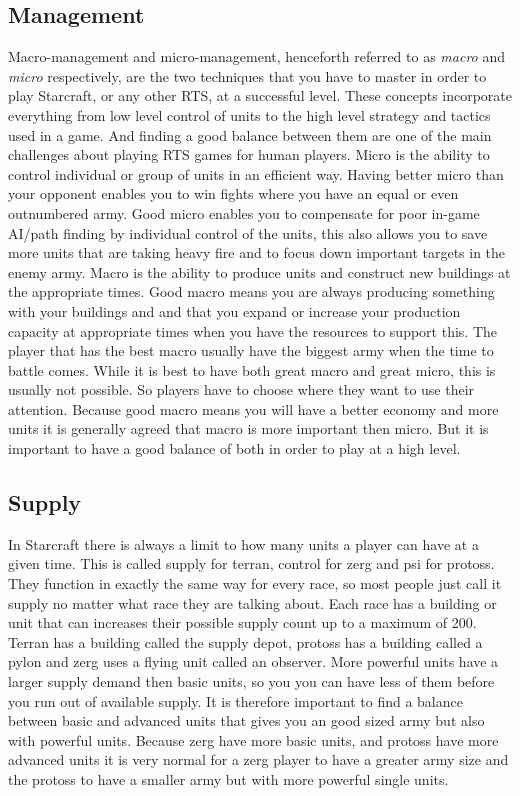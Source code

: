 \subsection{Management}
Macro-management and micro-management, henceforth referred to as \textit{macro}
and \textit{micro} respectively, are the two techniques that you have to master
in order to play Starcraft, or any other RTS, at a successful level. These
concepts incorporate everything from low level control of units to the high
level strategy and tactics used in a game. And finding a good balance between
them are one of the main challenges about playing RTS games for human players.
Micro is the ability to control individual or group of units in an efficient
way. Having better micro than your opponent enables you to win fights where you
have an equal or even outnumbered army. Good micro enables you to 
compensate for poor in-game AI/path finding by individual control of the
units, this also allows you to save more units that are taking heavy fire and to
focus down important targets in the enemy army. Macro is the ability to produce
units and construct new buildings at the appropriate times. Good macro means you
are always producing something with your buildings and and that you expand or
increase your production capacity at appropriate times when you have the
resources to support this. The player that has the best macro usually have the
biggest army when the time to battle comes. While it is best to have both great
macro and great micro, this is usually not possible. So players have to choose
where they want to use their attention. Because good macro means you will have a
better economy and more units it is generally agreed that macro is more
important then micro. But it is important to have a good balance of both in
order to play at a high level. 

\subsection{Supply}
In Starcraft there is always a limit to how many units a player can have at a
given time. This is called supply for terran, control for zerg and psi for
protoss. They function in exactly the same way for every race, so most people
just call it supply no matter what race they are talking about. Each race has a
building or unit that can increases their possible supply count up to a maximum
of 200. Terran has a building called the supply depot, protoss has a building
called a pylon and zerg uses a flying unit called an observer. More powerful
units have a larger supply demand then basic units, so you you can have less of
them before you run out of available supply. It is therefore important to find a
balance between basic and advanced units that gives you an good sized army but
also with powerful units. Because zerg have more basic units, and protoss have
more advanced units it is very normal for a zerg player to have a greater army
size and the protoss to have a smaller army but with more powerful single units.
 
